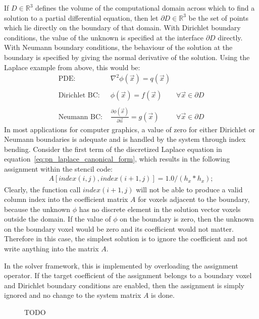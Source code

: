 If $D\in\mathbb{R}^3$ defines the volume of the computational domain across which to find a solution to a partial differential equation, then let $\partial D\in\mathbb{R}^3$ be the set of points which lie directly on the boundary of that domain. With Dirichlet boundary conditions, the value of the unknown is specified at the interface $\partial D$ directly. With Neumann boundary conditions, the behaviour of the solution at the boundary is specified by giving the normal derivative of the solution. Using the Laplace example from above, this would be:
\begin{align*}
\text{PDE:\ \ } & \nabla^2\phi\left(\vec{x}\right) = q\left(\vec{x}\right)
&
\\
\\
\text{Dirichlet BC:\ \ } & \phi\left(\vec{x}\right) = f\left(\vec{x}\right)
&\forall \vec{x}\in\partial D
\\
\\
\text{Neumann BC:\ \ } & \frac{\partial\phi\left(\vec{x}\right)}{\partial\vec{n}} = g\left(\vec{x}\right)
&\forall \vec{x}\in\partial D
\end{align*}
In most applications for computer graphics, a value of zero for either Dirichlet or Neumann boundaries is adequate and is handled by the system through index bending. Consider the first term of the discretized Laplace equation in equation~\ref{eq:pn_laplace_canonical_form}, which results in the following assignment within the stencil code:
\begin{align}
A[index(i,j), index(i+1, j)] = 1.0/(h_x*h_x);
\end{align}
Clearly, the function call $index(i+1, j)$ will not be able to produce a valid column index into the coefficient matrix $A$ for voxels adjacent to the boundary, because the unknown $\phi$ has no discrete element in the solution vector voxels outside the domain. If the value of $\phi$ on the boundary is zero, then the unknown on the boundary voxel would be zero and its coefficient would not matter. Therefore in this case, the simplest solution is to ignore the coefficient and not write anything into the matrix $A$.

In the solver framework, this is implemented by overloading the assignment operator. If the target coefficient of the assignment belongs to a boundary voxel and Dirichlet boundary conditions are enabled, then the assignment is simply ignored and no change to the system matrix $A$ is done.
\begin{figure}[h]
\centering
{}
\caption{TODO}
\label{fig:pn_bc_dirichlet}
\end{figure}

